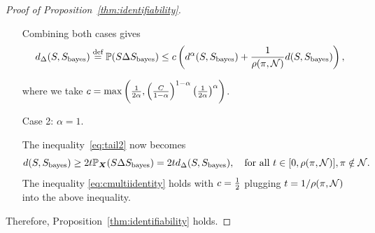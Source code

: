 \documentclass[11pt]{article}
\theoremstyle{plain}
\theoremstyle{definition}
\def\bayesS{S_{\textup{bayes}}}
\begin{document}
\begin{proof}[Proof of Proposition~\ref{thm:identifiability}]
\begin{enumerate}[label={2.\arabic*},wide, labelwidth=!, labelindent=0pt]
Combining both cases gives
\begin{align}\label{eq:cmultiidentity}
    d_\Delta(S,\bayesS) \stackrel{\text{def}}{=}\mathbb{P}(S\Delta\bayesS)\leq c\left(d^\alpha(S,\bayesS)+\frac{1}{\rho(\pi,\tN)}d(S,\bayesS)\right),
\end{align}

where we take $c= \max\left(\frac{1}{2\alpha},\left(C\over 1-\alpha\right)^{1-\alpha}\left(1\over 2\alpha\right)^\alpha\right)$. 

\item [Case 2:] $\alpha = 1$.

The inequality~\eqref{eq:tail2} now becomes
\[
d(S,\bayesS)\geq 2t\mathbb{P}_{\mX}(S\Delta \bayesS) = 2td_\Delta(S,\bayesS), \quad \text{for all }t\in[0,\rho(\pi,\tN)], \pi \notin\tN.
\]
The inequality \eqref{eq:cmultiidentity} holds with $c={1\over 2}$ plugging $t=1/\rho(\pi,\mathcal{N})$ into the above inequality.
\end{enumerate}
Therefore,  Proposition~\ref{thm:identifiability} holds.
\end{proof}
\end{document}
